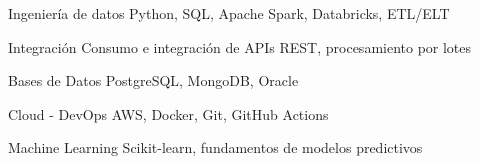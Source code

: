 
\begin{cvskills}

\cvskill
{Ingeniería de datos}
{Python, SQL, Apache Spark, Databricks, ETL/ELT}

\cvskill
{Integración}
{Consumo e integración de APIs REST, procesamiento por lotes}

\cvskill
{Bases de Datos}
{PostgreSQL, MongoDB, Oracle}

\cvskill
{Cloud - DevOps}
{AWS, Docker, Git, GitHub Actions}

\cvskill
{Machine Learning}
{Scikit-learn, fundamentos de modelos predictivos}

\end{cvskills}
